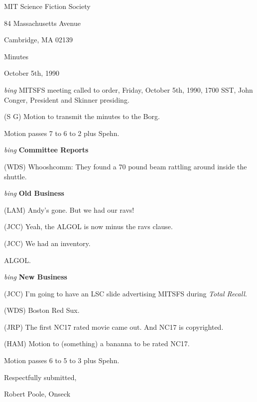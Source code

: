 \setlength{\topmargin}{-0.5in}
\setlength{\oddsidemargin}{0.0in}
\setlength{\evensidemargin}{0.0in}
\setlength{\textheight}{9in}
\setlength{\textwidth}{6.5in}



\begin{center}
MIT Science Fiction Society

84 Massachusetts Avenue

Cambridge, MA 02139

\vspace{0.2in}
Minutes

October 5th, 1990

\end{center}
 
\vspace{0.15in}
{\em bing\/}  MITSFS meeting called to order, Friday, October 5th, 1990,
1700 SST, John Conger, President and Skinner presiding.

(S G) Motion to transmit the minutes to the Borg.

Motion passes 7 to 6 to 2 plus Spehn.

\vspace{0.15in}
{\em bing\/} {\bf Committee Reports\/}

(WDS) Whooshcomm: They found a 70 pound beam rattling around inside the
shuttle.

\vspace{.15in}
{\em bing\/} {\bf Old Business\/}

(LAM) Andy's gone.  But we had our ravs!

(JCC) Yeah, the ALGOL is now minus the ravs clause.

(JCC) We had an inventory.

ALGOL.

\vspace{0.15in}
{\em bing\/} {\bf New Business\/}

(JCC) I'm going to have an LSC slide advertising MITSFS during {\em Total
Recall\/}.

(WDS) Boston Red Sux.

(JRP) The first NC17 rated movie came out.  And NC17 is copyrighted.

(HAM) Motion to (something) a bananna to be rated NC17.

Motion passes 6 to 5 to 3 plus Spehn.

\vspace{0.15in}
\begin{center}
Respectfully submitted,

Robert Poole, Onseck
\end{center}

